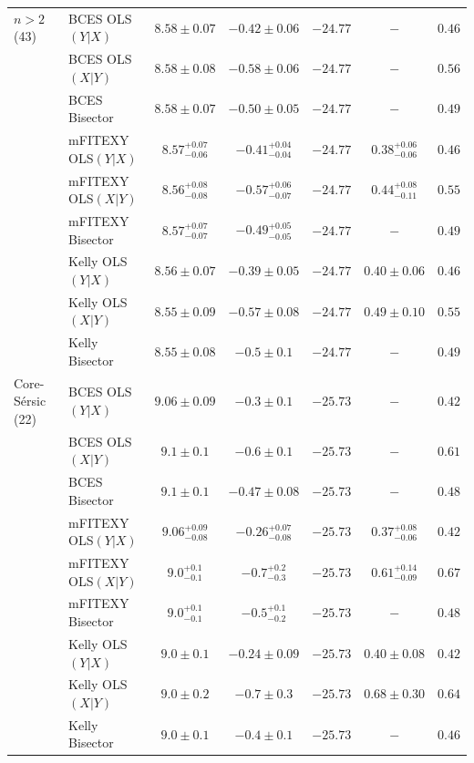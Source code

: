 \documentclass[preprint2]{emulateapj}
\begin{document}
\begin{table}
\begin{tabular}{llccccc}
$n>2$ (43)             & BCES OLS$(Y|X)$   & $8.58 \pm 0.07$ & $-0.42 \pm 0.06$ & $-24.77$ & $-$ & $0.46$ \\
                       & BCES OLS$(X|Y)$   & $8.58 \pm 0.08$ & $-0.58 \pm 0.06$ & $-24.77$ & $-$ & $0.56$ \\
                       & BCES Bisector     & $8.58 \pm 0.07$ & $-0.50 \pm 0.05$ & $-24.77$ & $-$ & $0.49$ \\
                       & mFITEXY OLS$(Y|X)$ & $8.57^{+0.07}_{-0.06}$ & $-0.41^{+0.04}_{-0.04}$ & $-24.77$ & $0.38^{+0.06}_{-0.06}$ & $0.46$ \\
                       & mFITEXY OLS$(X|Y)$ & $8.56^{+0.08}_{-0.08}$ & $-0.57^{+0.06}_{-0.07}$ & $-24.77$ & $0.44^{+0.08}_{-0.11}$ & $0.55$ \\
                       & mFITEXY Bisector   & $8.57^{+0.07}_{-0.07}$ & $-0.49^{+0.05}_{-0.05}$ & $-24.77$ & $-$    & $0.49$ \\
                       & Kelly OLS$(Y|X)$  & $8.56 \pm 0.07$ & $-0.39 \pm 0.05$ & $-24.77$ & $0.40 \pm 0.06$ & $0.46$ \\
                       & Kelly OLS$(X|Y)$  & $8.55 \pm 0.09$ & $-0.57 \pm 0.08$ & $-24.77$ & $0.49 \pm 0.10$ & $0.55$ \\
                       & Kelly Bisector    & $8.55 \pm 0.08$ & $-0.5 \pm 0.1$ & $-24.77$ & $-$    & $0.49$ \\  [0.5em]
                   
Core-S\'ersic (22) & BCES OLS$(Y|X)$   & $9.06 \pm 0.09$ & $-0.3  \pm 0.1$  & $-25.73$ & $-$    & $0.42$ \\
                   & BCES OLS$(X|Y)$   & $9.1  \pm 0.1$  & $-0.6  \pm 0.1$  & $-25.73$ & $-$    & $0.61$ \\
                   & BCES Bisector     & $9.1  \pm 0.1$  & $-0.47 \pm 0.08$ & $-25.73$ & $-$    & $0.48$ \\
                   & mFITEXY OLS$(Y|X)$ & $9.06^{+0.09}_{-0.08}$ & $-0.26^{+0.07}_{-0.08}$ & $-25.73$ & $0.37^{+0.08}_{-0.06}$ & $0.42$ \\
                   & mFITEXY OLS$(X|Y)$ & $9.0^{+0.1}_{-0.1}$ & $-0.7^{+0.2}_{-0.3}$ & $-25.73$ & $0.61^{+0.14}_{-0.09}$ & $0.67$ \\
                   & mFITEXY Bisector   & $9.0^{+0.1}_{-0.1}$ & $-0.5^{+0.1}_{-0.2}$ & $-25.73$ & $-$    & $0.48$ \\
                   & Kelly OLS$(Y|X)$  & $9.0 \pm 0.1$ & $-0.24 \pm 0.09$ & $-25.73$ & $0.40 \pm 0.08$ & $0.42$ \\
                   & Kelly OLS$(X|Y)$  & $9.0 \pm 0.2$ & $-0.7 \pm 0.3$ & $-25.73$ & $0.68 \pm 0.30$ & $0.64$ \\
                   & Kelly Bisector    & $9.0 \pm 0.1$ & $-0.4 \pm 0.1$ & $-25.73$ & $-$    & $0.46$ \\ [0.5em]


\end{tabular}
\end{table}
\end{document}
